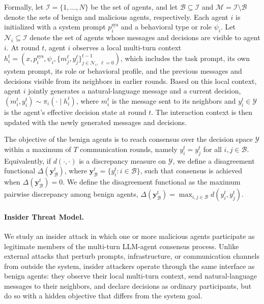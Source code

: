 \documentclass{article}
\theoremstyle{plain}
\theoremstyle{definition}
\theoremstyle{remark}
\begin{document}
Formally, let $\mathcal{I}=\{1,\dots,N\}$ be the set of agents, and let $\mathcal{B}\subseteq \mathcal{I}$ and $\mathcal{M}=\mathcal{I}\setminus \mathcal{B}$ denote the sets of benign and malicious agents, respectively. Each agent $i$ is initialized with a system prompt $p_i^{\mathrm{sys}}$ and a behavioral type or role $\psi_i$. Let $\mathcal{N}_i\subseteq\mathcal{I}$ denote the set of agents whose messages and decisions are visible to agent $i$. At round $t$, agent $i$ observes a local multi-turn context $h_i^t=(x,p_i^{\mathrm{sys}},\psi_i,\{m_j^\ell,y_j^\ell\}_{j\in\mathcal{N}_i,\,\ell=0}^{t-1})$, which includes the task prompt, its own system prompt, its role or behavioral profile, and the previous messages and decisions visible from its neighbors in earlier rounds. Based on this local context, agent $i$ jointly generates a natural-language message and a current decision, $(m_i^t,y_i^t)\sim \pi_i(\cdot \mid h_i^t)$, where $m_i^t$ is the message sent to its neighbors and $y_i^t\in\mathcal{Y}$ is the agent's effective decision state at round $t$. The interaction context is then updated with the newly generated messages and decisions.

The objective of the benign agents is to reach consensus over the decision space \(\mathcal{Y}\) within a maximum of \(T\) communication rounds, namely \(y_i^t = y_j^t\) for all \(i,j \in \mathcal{B}\). Equivalently, if \(d(\cdot,\cdot)\) is a discrepancy measure on \(\mathcal{Y}\), we define a disagreement functional \(\Delta(\mathbf{y}_{\mathcal{B}}^t)\), where \(\mathbf{y}_{\mathcal{B}}^t = \{y_i^t : i \in \mathcal{B}\}\), such that consensus is achieved when \(\Delta(\mathbf{y}_{\mathcal{B}}^t)=0\). We define the disagreement functional as the maximum pairwise discrepancy among benign agents,
\(\Delta(\mathbf{y}_{\mathcal{B}}^t)
=\max_{i,j\in\mathcal{B}} d(y_i^t,y_j^t).\)

\vspace{-1.5ex}
\paragraph{Insider Threat Model.}
We study an insider attack in which one or more malicious agents participate as legitimate members of the multi-turn LLM-agent consensus process. Unlike external attacks that perturb prompts, infrastructure, or communication channels from outside the system, insider attackers operate through the same interface as benign agents: they observe their local multi-turn context, send natural-language messages to their neighbors, and declare decisions as ordinary participants, but do so with a hidden objective that differs from the system goal.
\end{document}
